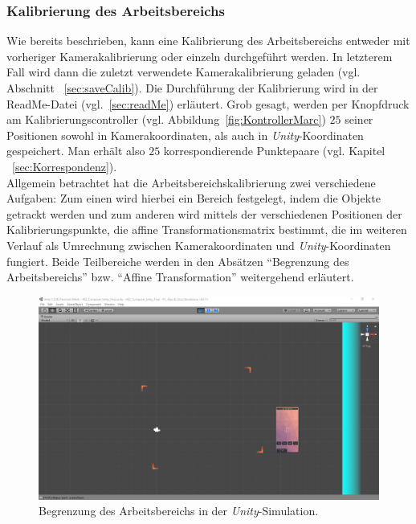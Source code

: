 \subsubsection{Kalibrierung des Arbeitsbereichs}\label{sec:planeCalib} 
Wie bereits beschrieben, kann eine Kalibrierung des Arbeitsbereichs entweder mit vorheriger Kamerakalibrierung oder einzeln durchgeführt werden. In letzterem Fall wird dann die zuletzt verwendete Kamerakalibrierung geladen (vgl. Abschnitt ~\ref{sec:saveCalib}). Die Durchführung der Kalibrierung wird in der ReadMe-Datei (vgl.~\ref{sec:readMe}) erläutert. Grob gesagt, werden per Knopfdruck am Kalibrierungscontroller (vgl. Abbildung~\ref{fig:KontrollerMarc}) $25$ seiner Positionen sowohl in Kamerakoordinaten, als auch in \emph{Unity}-Koordinaten gespeichert. Man erhält also $25$ korrespondierende Punktepaare (vgl. Kapitel ~\ref{sec:Korrespondenz}).\\
Allgemein betrachtet hat die Arbeitsbereichskalibrierung zwei verschiedene Aufgaben: Zum einen wird hierbei ein Bereich festgelegt, indem die Objekte getrackt werden und zum anderen wird mittels der verschiedenen Positionen der Kalibrierungspunkte, die affine Transformationsmatrix bestimmt, die im weiteren Verlauf als Umrechnung zwischen Kamerakoordinaten und \emph{Unity}-Koordinaten fungiert. Beide Teilbereiche werden in den Absätzen "`Begrenzung des Arbeitsbereichs"' bzw. "`Affine Transformation"' weitergehend erläutert.

\begin{figure}
	\centering
	\includegraphics[width=\textwidth, trim=7cm 2cm 5cm 6cm, clip]{Bilder/Neue Screenshots/Arbeitsbereich.PNG}
	\caption[Begrenzung des Arbeitsbereichs in der \emph{Unity}-Simulation]{Begrenzung des Arbeitsbereichs in der \emph{Unity}-Simulation.}
	\label{fig:begrenzungArbeitsbereich}
\end{figure}

